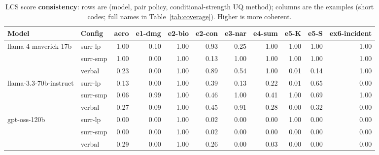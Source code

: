 \documentclass[11pt]{article}
\begin{document}
\begin{table}[htbp]
\centering
\footnotesize
\setlength{\tabcolsep}{3.5pt}
\caption{LCS score \textbf{consistency}: rows are (model, pair policy, conditional-strength UQ method); columns are the examples (short codes; full names in Table~\ref{tab:coverage}). Higher is more coherent.}
\label{tab:consistency}
\begin{tabular}{llrrrrrrrrr}
\toprule
\textbf{Model} & \textbf{Config} & \textbf{aero} & \textbf{e1-dmg} & \textbf{e2-bio} & \textbf{e2-con} & \textbf{e3-nar} & \textbf{e4-sum} & \textbf{e5-K} & \textbf{e5-S} & \textbf{ex6-incident} \\
\midrule
llama-4-maverick-17b & surr-lp & 1.00 & 0.10 & 1.00 & 0.93 & 0.25 & 1.00 & 1.00 & 1.00 & 1.00 \\
 & surr-smp & 1.00 & 0.00 & 1.00 & 0.13 & 1.00 & 1.00 & 1.00 & 1.00 & 1.00 \\
 & verbal & 0.23 & 0.00 & 1.00 & 0.89 & 0.54 & 1.00 & 0.01 & 0.14 & 1.00 \\
\midrule
llama-3.3-70b-instruct & surr-lp & 0.13 & 0.00 & 1.00 & 0.39 & 0.13 & 0.22 & 0.01 & 0.65 & 0.00 \\
 & surr-smp & 0.06 & 0.99 & 1.00 & 0.46 & 1.00 & 0.41 & 1.00 & 0.69 & 1.00 \\
 & verbal & 0.27 & 0.09 & 1.00 & 0.45 & 0.91 & 0.28 & 0.00 & 0.32 & 0.00 \\
\midrule
gpt-oss-120b & surr-lp & 0.00 & 0.00 & 1.00 & 0.02 & 0.00 & 0.00 & 1.00 & 0.00 & 0.00 \\
 & surr-smp & 0.00 & 0.00 & 1.00 & 0.02 & 0.00 & 0.00 & 0.00 & 0.00 & 0.00 \\
 & verbal & 0.29 & 0.00 & 1.00 & 0.26 & 0.00 & 0.03 & 0.00 & 0.00 & 0.00 \\
\bottomrule
\end{tabular}
\end{table}
\end{document}
